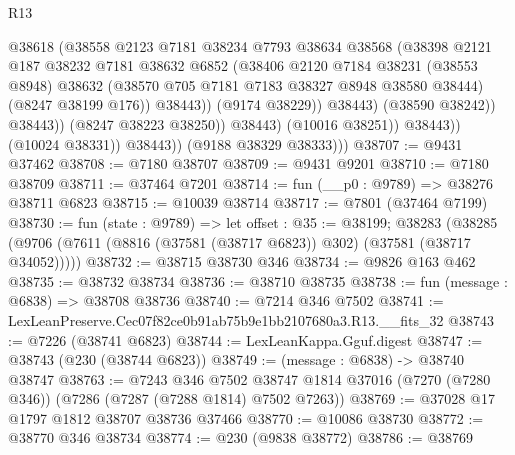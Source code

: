 \begin{lexlean}{R13}
\begin{coremodule}
                                  @38618
                                  (@38558
                                    @2123
                                    @7181
                                    @38234
                                    @7793
                                    @38634
                                    @38568
                                    (@38398
                                      @2121
                                      @187
                                      @38232
                                      @7181
                                      @38632
                                      @6852
                                      (@38406
                                        @2120
                                        @7184
                                        @38231
                                        (@38553 @8948)
                                        @38632
                                        (@38570 @705 @7181 @7183 @38327 @8948 @38580 @38444)
                                        (@8247 @38199 @176))
                                      @38443))
                                  (@9174 @38229))
                                @38443)
                              (@38590 @38242))
                            @38443))
                        (@8247 @38223 @38250))
                      @38443)
                    (@10016 @38251))
                  @38443))
              (@10024 @38331))
            @38443))
        (@9188 @38329 @38333)))
@38707 := @9431 @37462
@38708 := @7180 @38707
@38709 := @9431 @9201
@38710 := @7180 @38709
@38711 := @37464 @7201
@38714 := fun (__p0 : @9789) => @38276 @38711 @6823
@38715 := @10039 @38714
@38717 := @7801 (@37464 @7199)
@38730 := fun (state : @9789) =>
  let offset : @35 := @38199;
  @38283 (@38285 (@9706 (@7611 (@8816 (@37581 (@38717 @6823)) @302) (@37581 (@38717 @34052)))))
@38732 := @38715 @38730 @346
@38734 := @9826 @163 @462
@38735 := @38732 @38734
@38736 := @38710 @38735
@38738 := fun (message : @6838) => @38708 @38736
@38740 := @7214 @346 @7502
@38741 := LexLeanPreserve.Cec07f82ce0b91ab75b9e1bb2107680a3.R13.__fits_32
@38743 := @7226 (@38741 @6823)
@38744 := LexLeanKappa.Gguf.digest
@38747 := @38743 (@230 (@38744 @6823))
@38749 := (message : @6838) -> @38740 @38747
@38763 := @7243
    @346
    @7502
    @38747
    @1814
    @37016
    (@7270 (@7280 @346))
    (@7286 (@7287 (@7288 @1814) @7502 @7263))
@38769 := @37028 @17 @1797 @1812 @38707 @38736 @37466
@38770 := @10086 @38730
@38772 := @38770 @346 @38734
@38774 := @230 (@9838 @38772)
@38786 := @38769

\end{coremodule}
\end{lexlean}

